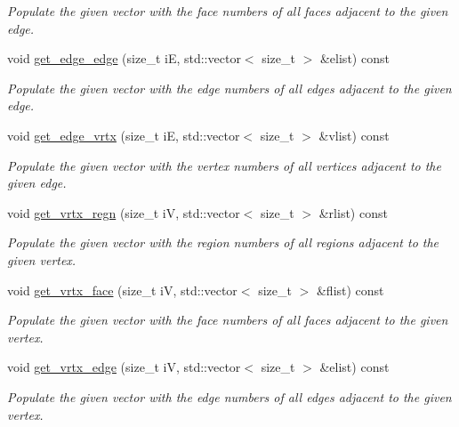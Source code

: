 \begin{DoxyCompactItemize}
\begin{DoxyCompactList}\small\item\em Populate the given vector with the face numbers of all faces adjacent to the given edge. \end{DoxyCompactList}\item 
void \hyperlink{classStemMesh3D_1_1mesh__3Dv_a06babc4d9918195a426c4800dec47979}{get\+\_\+edge\+\_\+edge} (size\+\_\+t iE, std\+::vector$<$ size\+\_\+t $>$ \&elist) const
\begin{DoxyCompactList}\small\item\em Populate the given vector with the edge numbers of all edges adjacent to the given edge. \end{DoxyCompactList}\item 
void \hyperlink{classStemMesh3D_1_1mesh__3Dv_ab815cec3c06264372a7e57e01e1db380}{get\+\_\+edge\+\_\+vrtx} (size\+\_\+t iE, std\+::vector$<$ size\+\_\+t $>$ \&vlist) const
\begin{DoxyCompactList}\small\item\em Populate the given vector with the vertex numbers of all vertices adjacent to the given edge. \end{DoxyCompactList}\item 
void \hyperlink{classStemMesh3D_1_1mesh__3Dv_a39a03b8697cda8c74485cfc118299eea}{get\+\_\+vrtx\+\_\+regn} (size\+\_\+t iV, std\+::vector$<$ size\+\_\+t $>$ \&rlist) const
\begin{DoxyCompactList}\small\item\em Populate the given vector with the region numbers of all regions adjacent to the given vertex. \end{DoxyCompactList}\item 
void \hyperlink{classStemMesh3D_1_1mesh__3Dv_a75a75c96ae9daf80877c60480020667a}{get\+\_\+vrtx\+\_\+face} (size\+\_\+t iV, std\+::vector$<$ size\+\_\+t $>$ \&flist) const
\begin{DoxyCompactList}\small\item\em Populate the given vector with the face numbers of all faces adjacent to the given vertex. \end{DoxyCompactList}\item 
void \hyperlink{classStemMesh3D_1_1mesh__3Dv_aa5e678364abe37ff90930374d706cf6f}{get\+\_\+vrtx\+\_\+edge} (size\+\_\+t iV, std\+::vector$<$ size\+\_\+t $>$ \&elist) const
\begin{DoxyCompactList}\small\item\em Populate the given vector with the edge numbers of all edges adjacent to the given vertex. \end{DoxyCompactList}\item 

\end{DoxyCompactItemize}
